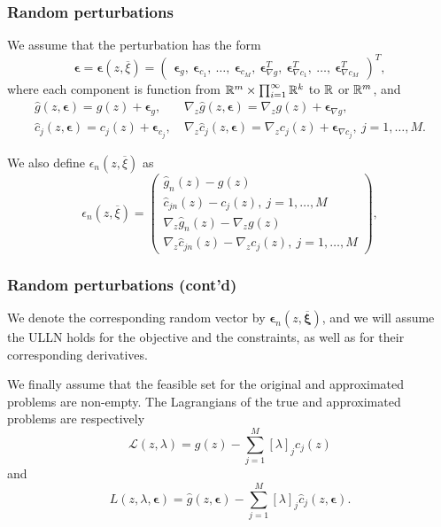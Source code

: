 \documentclass{beamer}
\def\bxi{\boldsymbol\xi}
\def\bepsilon{\boldsymbol\epsilon}
\begin{document}
\begin{frame}
\frametitle{Random perturbations}

We assume that the perturbation has the form
\[
\bepsilon = \bepsilon(z,\overline{\xi}) =
\begin{pmatrix} \bepsilon_g,\
\bepsilon_{c_1},\ 
\ldots,\ 
\bepsilon_{c_M},\ 
\bepsilon^T_{\nabla g},\ 
\bepsilon^T_{\nabla c_1},\ 
\ldots,\ 
\bepsilon^T_{\nabla c_M}
\end{pmatrix}^T,
\]
where each component is function from $\mathbb{R}^m \times \prod_{i = 1}^{\infty} \mathbb{R}^k$ to $\mathbb{R}$ or $\mathbb{R}^m$, and
\[
\begin{aligned}
\hat{g} (z, \boldsymbol{\epsilon}) = g(z) + \boldsymbol{\epsilon}_g,\ &
\nabla_z \hat{g} (z, \boldsymbol{\epsilon}) = \nabla_z g(z) +
\boldsymbol{\epsilon}_{\nabla g}, \\
\hat{c}_j (z, \boldsymbol{\epsilon}) = c_j(z) +
\boldsymbol{\epsilon}_{c_j},\ &
\nabla_z \hat{c}_j (z, \boldsymbol{\epsilon}) = \nabla_z c_j(z) +
\boldsymbol{\epsilon}_{\nabla c_j},\ j = 1,\ldots, M.
\end{aligned}
\]

\mbox{}

We also define $\epsilon_n (z, \overline{\xi} )$ as
\[
\epsilon_n(z, \overline{\xi}) = \begin{pmatrix} \hat{g}_n(z)-g(z) \\
\hat{c}_{jn}(z)-c_j(z),\ j=1,\ldots,M\\
\nabla_z \hat{g}_n(z) -
\nabla_z g(z)\\
\nabla_z \hat{c}_{jn}(z)- \nabla_z c_j(z),\ j=1,\ldots,M \end{pmatrix},
\]

\end{frame}

\begin{frame}
\frametitle{Random perturbations (cont'd)}

We denote the corresponding random vector by $\boldsymbol{\epsilon}_n (z, \overline{\bxi} )$, and we will assume the ULLN holds for the objective and 
the constraints, as well as for their corresponding derivatives.

\mbox{}

We finally assume that the feasible set for the original and approximated problems are non-empty.
The Lagrangians of the true and approximated problems are respectively
\[
\mathcal{L}(z, \lambda) = g(z) - \sum_{j = 1}^M [\lambda]_j c_j(z)
\]
and
\[
L(z, \lambda, \boldsymbol{\epsilon}) = \hat{g}(z,
\boldsymbol{\epsilon}) - \sum_{j = 1}^M [\lambda]_j \hat{c}_j(z,
\boldsymbol{\epsilon}).
\]

\end{frame}
\end{document}

